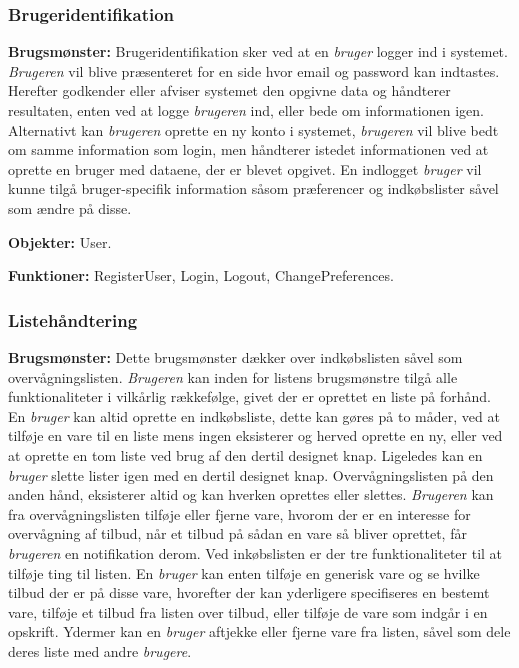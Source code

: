 \subsubsection*{Brugeridentifikation}
\textbf{Brugsmønster:} Brugeridentifikation sker ved at en \textit{bruger} logger ind i systemet. 
\textit{Brugeren} vil blive præsenteret for en side hvor email og password kan indtastes.
Herefter godkender eller afviser systemet den opgivne data og håndterer resultaten, enten ved at logge \textit{brugeren} ind, eller bede om informationen igen.
Alternativt kan \textit{brugeren} oprette en ny konto i systemet, \textit{brugeren} vil blive bedt om samme information som login, men håndterer istedet informationen ved at oprette en bruger med dataene, der er blevet opgivet.
En indlogget \textit{bruger} vil kunne tilgå bruger-specifik information såsom præferencer og indkøbslister såvel som ændre på disse.

\textbf{Objekter:} User.

\textbf{Funktioner:} RegisterUser, Login, Logout, ChangePreferences.

\subsubsection*{Listehåndtering}
\textbf{Brugsmønster:} Dette brugsmønster dækker over indkøbslisten såvel som overvågningslisten. 
\textit{Brugeren} kan inden for listens brugsmønstre tilgå alle funktionaliteter i vilkårlig rækkefølge, givet der er oprettet en liste på forhånd. 
En \textit{bruger} kan altid oprette en indkøbsliste, dette kan gøres på to måder, ved at tilføje en vare til en liste mens ingen eksisterer og herved oprette en ny, eller ved at oprette en tom liste ved brug af den dertil designet knap.
Ligeledes kan en \textit{bruger} slette lister igen med en dertil designet knap.
Overvågningslisten på den anden hånd, eksisterer altid og kan hverken oprettes eller slettes.
\textit{Brugeren} kan fra overvågningslisten tilføje eller fjerne vare, hvorom der er en interesse for overvågning af tilbud, når et tilbud på sådan en vare så bliver oprettet, får \textit{brugeren} en notifikation derom.
Ved inkøbslisten er der tre funktionaliteter til at tilføje ting til listen.
En \textit{bruger} kan enten tilføje en generisk vare og se hvilke tilbud der er på disse vare, hvorefter der kan yderligere specifiseres en bestemt vare, tilføje et tilbud fra listen over tilbud, eller tilføje de vare som indgår i en opskrift.
Ydermer kan en \textit{bruger} aftjekke eller fjerne vare fra listen, såvel som dele deres liste med andre \textit{brugere}.

